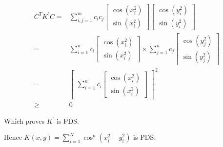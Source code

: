 \documentclass{article}
\begin{document}
\begin{description}
    \begin{align}
    C^{T}K^{'}C  =& \sum_{i,j = 1}^{m} c_{i}c_{j} \begin{bmatrix} \cos (x_{i}^{2}) \\ \sin (x_{i}^{2}) \end{bmatrix} \begin{bmatrix} \cos (y_{i}^{2}) \\ \sin (y_{i}^{2}) \end{bmatrix} \\
      =& \sum_{i=1}^{n}c_{i} \begin{bmatrix} \cos (x_{i}^{2}) \\ \sin (x_{i}^{2}) \end{bmatrix} \times \sum_{j=1}^{n}c_{j} \begin{bmatrix} \cos (y_{j}^{2}) \\ \sin (y_{j}^{2}) \end{bmatrix}\\
    =& \begin{bmatrix} \sum_{i=1}^{n} c_{i} \begin{bmatrix} \cos (x_{i}^{2}) \\ \sin (x_{i}^{2})  \end{bmatrix} \end{bmatrix}^{2} \\
    \ge& 0
    \end{align}

    Which proves \( K^{'} \) is PDS. 


    Hence \( K(x,y) = \sum_{i=1}^{N} \cos^{n} (x_{i}^{2} - y_{i}^{2} ) \) is PDS.
\end{description}
\end{document}
